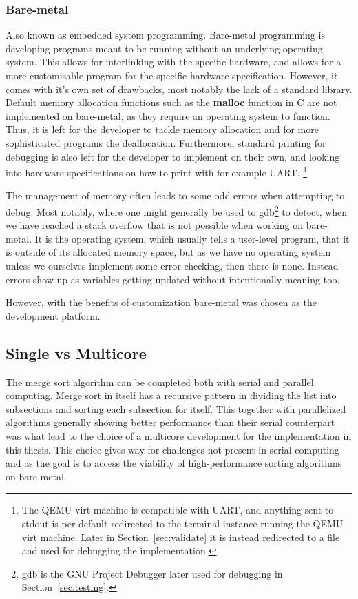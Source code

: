 \subsubsection{Bare-metal}\label{sec:bare-metal}
Also known as embedded system programming. Bare-metal programming is developing
programs meant to be running without an underlying operating system. This allows
for interlinking with the specific hardware, and allows for a more customisable
program for the specific hardware specification. However, it comes with it's own
set of drawbacks, most notably the lack of a standard library. Default memory
allocation functions such as the \textbf{malloc} function in C are not
implemented on bare-metal, as they require an operating system to function. Thus,
it is left for the developer to tackle memory allocation and for more
sophisticated programs the deallocation. Furthermore, standard printing for
debugging is also left for the developer to implement on their own, and looking
into hardware specifications on how to print with for example UART. \cite{uart}
\footnote{The QEMU virt machine is compatible with UART, and anything sent to
  stdout is per default redirected to the terminal instance running the QEMU
  virt machine. Later in Section~\ref{sec:validate} it is instead redirected to
  a file and used for debugging the implementation.}

The management of memory often leads to some odd errors when attempting to
debug. Most notably, where one might generally be used to gdb\footnote{gdb is
the GNU Project Debugger later used for debugging in Section~\ref{sec:testing}.}
to detect, when we have reached a stack overflow that is not possible when
working on bare-metal. It is the operating system, which usually tells a
user-level program, that it is outside of its allocated memory space, but as we
have no operating system unless we ourselves implement some error checking, then
there is none. Instead errors show up as variables getting updated without
intentionally meaning too.

However, with the benefits of customization bare-metal was chosen as the
development platform.


\subsection{Single vs Multicore}\label{sec:singlevsmulti}
The merge sort algorithm can be completed both with serial and parallel
computing. Merge sort in itself has a recursive pattern in dividing the list into
subsections and sorting each subsection for itself. This together with
parallelized algorithms generally showing better performance than their serial
counterpart was what lead to the choice of a multicore development for the
implementation in this thesis. \cite{comp_parallel} This choice gives way for
challenges not present in serial computing and as the goal is to access the
viability of high-performance sorting algorithms on bare-metal.


